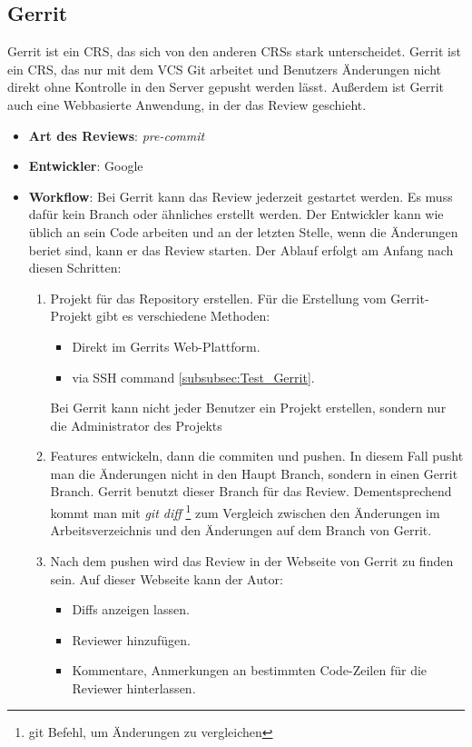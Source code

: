 \subsection{Gerrit}
\label{subsec:Gerrit}

Gerrit ist ein \ac{CRS}, das sich von den anderen \acp{CRS} stark unterscheidet. Gerrit ist ein \ac{CRS}, das nur mit dem \ac{VCS} Git arbeitet und Benutzers Änderungen nicht direkt ohne Kontrolle in den Server gepusht werden lässt. Außerdem ist Gerrit auch eine Webbasierte Anwendung, in der das Review geschieht.

\begin{itemize}
	\item \textbf{Art des Reviews}: \textit{pre-commit}
	\item \textbf{Entwickler}: Google
	\item \textbf{Workflow}: Bei Gerrit kann das Review jederzeit gestartet werden. Es muss dafür kein Branch oder ähnliches erstellt werden. Der Entwickler kann wie üblich an sein Code arbeiten und an der letzten Stelle, wenn die Änderungen beriet sind, kann er das Review starten. Der Ablauf erfolgt am Anfang nach diesen Schritten:
	
		\begin{enumerate}
			\item Projekt für das Repository erstellen. Für die Erstellung vom Gerrit-Projekt gibt es verschiedene Methoden:
			
			\begin{itemize}
				\item Direkt im Gerrits Web-Plattform.
				\item via \ac{SSH} command \cref{subsubsec:Test_Gerrit}.
			\end{itemize}
			
			Bei Gerrit kann nicht jeder Benutzer ein Projekt erstellen, sondern nur die Administrator des Projekts		
			
			\item Features entwickeln, dann die commiten und pushen. In diesem Fall pusht man die Änderungen nicht in den Haupt Branch, sondern in einen Gerrit Branch.
				Gerrit benutzt dieser Branch für das Review. Dementsprechend kommt man mit \textit{git diff} \footnote{git Befehl, um Änderungen zu vergleichen} zum 							Vergleich zwischen den Änderungen im Arbeitsverzeichnis und den Änderungen auf dem Branch von Gerrit.
				
			\item Nach dem pushen wird das Review in der Webseite von Gerrit zu finden sein. Auf dieser Webseite kann der Autor: 
			\begin{itemize}
				\item Diffs anzeigen lassen.
				\item Reviewer hinzufügen.
				\item Kommentare, Anmerkungen an bestimmten Code-Zeilen für die Reviewer hinterlassen.
			\end{itemize}
			

\end{enumerate}
\end{itemize}
